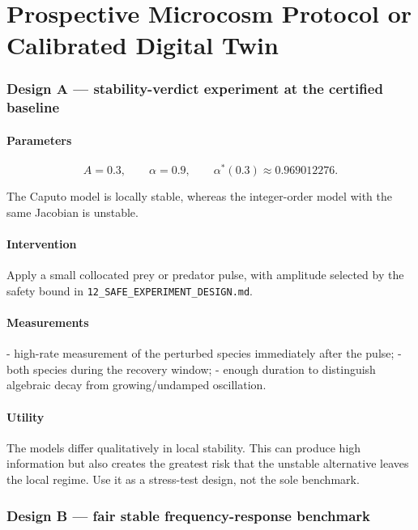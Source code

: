 \section{Prospective Microcosm Protocol or Calibrated Digital Twin}\label{sec:prospect}
\subsubsection{Design A --- stability-verdict experiment at the certified baseline}

\paragraph{Parameters}

\[
A=0.3,
\qquad \alpha=0.9,
\qquad \alpha^*(0.3)\approx0.969012276.
\]

The Caputo model is locally stable, whereas the integer-order model with the same Jacobian is unstable.

\paragraph{Intervention}

Apply a small collocated prey or predator pulse, with amplitude selected by the safety bound in \texttt{12\_SAFE\_EXPERIMENT\_DESIGN.md}.

\paragraph{Measurements}

- high-rate measurement of the perturbed species immediately after the pulse;
- both species during the recovery window;
- enough duration to distinguish algebraic decay from growing/undamped oscillation.

\paragraph{Utility}

The models differ qualitatively in local stability. This can produce high information but also creates the greatest risk that the unstable alternative leaves the local regime. Use it as a stress-test design, not the sole benchmark.

\subsubsection{Design B --- fair stable frequency-response benchmark}

